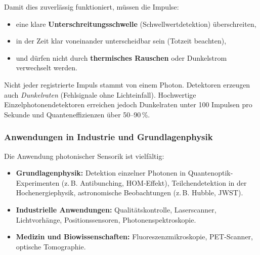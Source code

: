 Damit dies zuverlässig funktioniert, müssen die Impulse:
\begin{itemize}
	\item eine klare \textbf{Unterschreitungsschwelle} (Schwellwertdetektion) überschreiten,
	\item in der Zeit klar voneinander unterscheidbar sein (Totzeit beachten),
	\item und dürfen nicht durch \textbf{thermisches Rauschen} oder Dunkelstrom verwechselt werden.
\end{itemize}
\medskip
\begin{tcolorbox}[didaktikbox, title=Was zählt als Photon? ]
	\label{box:photonenzaehlung}
	\small
	Nicht jeder registrierte Impuls stammt von einem Photon. Detektoren erzeugen auch \emph{Dunkelraten} (Fehlsignale ohne Lichteinfall). Hochwertige Einzelphotonendetektoren erreichen jedoch Dunkelraten unter 100 Impulsen pro Sekunde und Quanteneffizienzen über 50–90\,\%.
\end{tcolorbox}

\subsubsection{Anwendungen in Industrie und Grundlagenphysik}

Die Anwendung photonischer Sensorik ist vielfältig:

\begin{itemize}
	\item \textbf{Grundlagenphysik:} Detektion einzelner Photonen in Quantenoptik-Experimenten (z.\,B. Antibunching, HOM-Effekt), Teilchendetektion in der Hochenergiephysik, astronomische Beobachtungen (z.\,B. Hubble, JWST).
	\item \textbf{Industrielle Anwendungen:} Qualitätskontrolle, Laserscanner, Lichtvorhänge, Positionssensoren, Photonenspektroskopie.
	\item \textbf{Medizin und Biowissenschaften:} Fluoreszenzmikroskopie, PET-Scanner, optische Tomographie.
\end{itemize}


